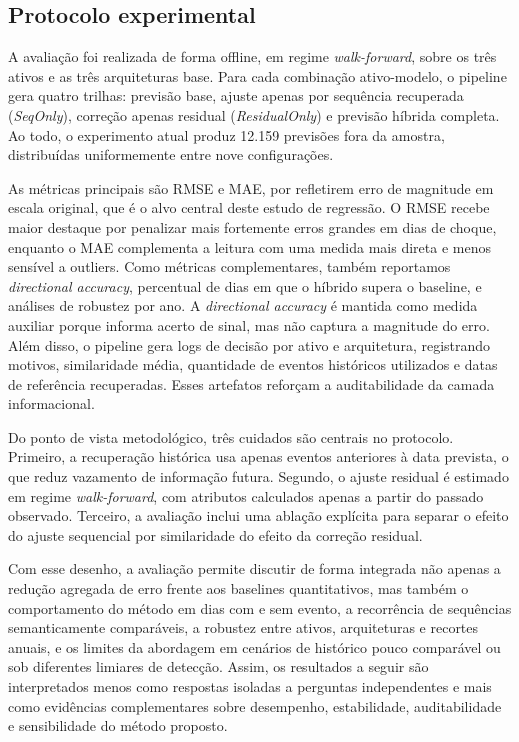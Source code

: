 \documentclass[conference]{IEEEtran}
\begin{document}
\subsection{Protocolo experimental}

A avaliação foi realizada de forma offline, em regime \textit{walk-forward}, sobre os três ativos e as três arquiteturas base. Para cada combinação ativo-modelo, o pipeline gera quatro trilhas: previsão base, ajuste apenas por sequência recuperada (\textit{SeqOnly}), correção apenas residual (\textit{ResidualOnly}) e previsão híbrida completa. Ao todo, o experimento atual produz 12.159 previsões fora da amostra, distribuídas uniformemente entre nove configurações.

As métricas principais são RMSE e MAE, por refletirem erro de magnitude em escala original, que é o alvo central deste estudo de regressão. O RMSE recebe maior destaque por penalizar mais fortemente erros grandes em dias de choque, enquanto o MAE complementa a leitura com uma medida mais direta e menos sensível a outliers. Como métricas complementares, também reportamos \textit{directional accuracy}, percentual de dias em que o híbrido supera o baseline, e análises de robustez por ano. A \textit{directional accuracy} é mantida como medida auxiliar porque informa acerto de sinal, mas não captura a magnitude do erro. Além disso, o pipeline gera logs de decisão por ativo e arquitetura, registrando motivos, similaridade média, quantidade de eventos históricos utilizados e datas de referência recuperadas. Esses artefatos reforçam a auditabilidade da camada informacional.

Do ponto de vista metodológico, três cuidados são centrais no protocolo. Primeiro, a recuperação histórica usa apenas eventos anteriores à data prevista, o que reduz vazamento de informação futura. Segundo, o ajuste residual é estimado em regime \textit{walk-forward}, com atributos calculados apenas a partir do passado observado. Terceiro, a avaliação inclui uma ablação explícita para separar o efeito do ajuste sequencial por similaridade do efeito da correção residual.

Com esse desenho, a avaliação permite discutir de forma integrada não apenas a redução agregada de erro frente aos baselines quantitativos, mas também o comportamento do método em dias com e sem evento, a recorrência de sequências semanticamente comparáveis, a robustez entre ativos, arquiteturas e recortes anuais, e os limites da abordagem em cenários de histórico pouco comparável ou sob diferentes limiares de detecção. Assim, os resultados a seguir são interpretados menos como respostas isoladas a perguntas independentes e mais como evidências complementares sobre desempenho, estabilidade, auditabilidade e sensibilidade do método proposto.
\end{document}
